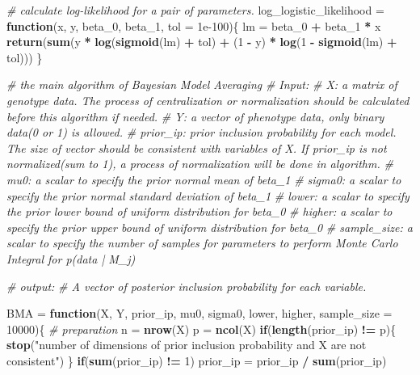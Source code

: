 \documentclass[
]{article}
\newenvironment{Shaded}{\begin{snugshade}}{\end{snugshade}}
\newcommand{\CommentTok}[1]{\textcolor[rgb]{0.56,0.35,0.01}{\textit{#1}}}
\newcommand{\ControlFlowTok}[1]{\textcolor[rgb]{0.13,0.29,0.53}{\textbf{#1}}}
\newcommand{\DataTypeTok}[1]{\textcolor[rgb]{0.13,0.29,0.53}{#1}}
\newcommand{\DecValTok}[1]{\textcolor[rgb]{0.00,0.00,0.81}{#1}}
\newcommand{\FloatTok}[1]{\textcolor[rgb]{0.00,0.00,0.81}{#1}}
\newcommand{\KeywordTok}[1]{\textcolor[rgb]{0.13,0.29,0.53}{\textbf{#1}}}
\newcommand{\NormalTok}[1]{#1}
\newcommand{\OperatorTok}[1]{\textcolor[rgb]{0.81,0.36,0.00}{\textbf{#1}}}
\newcommand{\StringTok}[1]{\textcolor[rgb]{0.31,0.60,0.02}{#1}}
\begin{document}
\begin{Shaded}
\begin{Highlighting}[]
\CommentTok{# calculate log-likelihood for a pair of parameters.}
\NormalTok{log_logistic_likelihood =}\StringTok{ }\ControlFlowTok{function}\NormalTok{(x, y, beta_}\DecValTok{0}\NormalTok{, beta_}\DecValTok{1}\NormalTok{, }\DataTypeTok{tol =} \FloatTok{1e-100}\NormalTok{)\{}
\NormalTok{  lm =}\StringTok{ }\NormalTok{beta_}\DecValTok{0} \OperatorTok{+}\StringTok{ }\NormalTok{beta_}\DecValTok{1} \OperatorTok{*}\StringTok{ }\NormalTok{x}
  \KeywordTok{return}\NormalTok{(}\KeywordTok{sum}\NormalTok{(y }\OperatorTok{*}\StringTok{ }\KeywordTok{log}\NormalTok{(}\KeywordTok{sigmoid}\NormalTok{(lm) }\OperatorTok{+}\StringTok{ }\NormalTok{tol) }\OperatorTok{+}\StringTok{ }\NormalTok{(}\DecValTok{1} \OperatorTok{-}\StringTok{ }\NormalTok{y) }\OperatorTok{*}\StringTok{ }\KeywordTok{log}\NormalTok{(}\DecValTok{1} \OperatorTok{-}\StringTok{ }\KeywordTok{sigmoid}\NormalTok{(lm) }\OperatorTok{+}\StringTok{ }\NormalTok{tol)))}
\NormalTok{\}}

\CommentTok{# the main algorithm of Bayesian Model Averaging}
\CommentTok{# Input:}
\CommentTok{# X: a matrix of genotype data. The process of centralization or normalization should be calculated before this algorithm if needed.}
\CommentTok{# Y: a vector of phenotype data, only binary data(0 or 1) is allowed. }
\CommentTok{# prior_ip: prior inclusion probability for each model. The size of vector should be consistent with variables of X. If prior_ip is not normalized(sum to 1), a process of normalization will be done in algorithm.}
\CommentTok{# mu0: a scalar to specify the prior normal mean of beta_1}
\CommentTok{# sigma0: a scalar to specify the prior normal standard deviation of beta_1}
\CommentTok{# lower: a scalar to specify the prior lower bound of uniform distribution for beta_0}
\CommentTok{# higher: a scalar to specify the prior upper bound of uniform distribution for beta_0}
\CommentTok{# sample_size: a scalar to specify the number of samples for parameters to perform Monte Carlo Integral for p(data | M_j)}

\CommentTok{# output:}
\CommentTok{# A vector of posterior inclusion probability for each variable.}

\NormalTok{BMA =}\StringTok{ }\ControlFlowTok{function}\NormalTok{(X, Y, prior_ip, mu0, sigma0, lower, higher, }\DataTypeTok{sample_size =} \DecValTok{10000}\NormalTok{)\{}
  \CommentTok{# preparation}
\NormalTok{  n =}\StringTok{ }\KeywordTok{nrow}\NormalTok{(X)}
\NormalTok{  p =}\StringTok{ }\KeywordTok{ncol}\NormalTok{(X)}
  \ControlFlowTok{if}\NormalTok{(}\KeywordTok{length}\NormalTok{(prior_ip) }\OperatorTok{!=}\StringTok{ }\NormalTok{p)\{}
    \KeywordTok{stop}\NormalTok{(}\StringTok{"number of dimensions of prior inclusion probability and X are not consistent"}\NormalTok{)}
\NormalTok{  \}}
  \ControlFlowTok{if}\NormalTok{(}\KeywordTok{sum}\NormalTok{(prior_ip) }\OperatorTok{!=}\StringTok{ }\DecValTok{1}\NormalTok{)}
\NormalTok{    prior_ip =}\StringTok{ }\NormalTok{prior_ip }\OperatorTok{/}\StringTok{ }\KeywordTok{sum}\NormalTok{(prior_ip)}
  

\end{Highlighting}
\end{Shaded}
\end{document}
